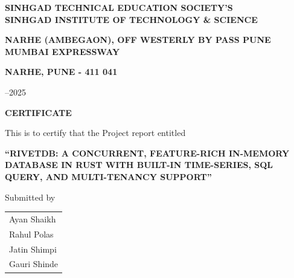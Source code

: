 \documentclass[12pt,a4paper]{report}
\begin{document}
\begin{titlepage}
\begin{center}
{\fontsize{14}{16}\selectfont \textbf{SINHGAD TECHNICAL EDUCATION SOCIETY'S\\
SINHGAD INSTITUTE OF TECHNOLOGY \& SCIENCE}}

\vspace{0.5\baselineskip}

{\fontsize{12}{14}\selectfont \textbf{NARHE (AMBEGAON), OFF WESTERLY BY PASS PUNE MUMBAI EXPRESSWAY}}

\vspace{0.5\baselineskip}

{\fontsize{14}{16}\selectfont \textbf{NARHE, PUNE - 411 041}}

\vspace{1.5\baselineskip}

{\fontsize{14}{16}--2025}

\end{center}
\end{titlepage}

\newpage
\thispagestyle{plain}
\begin{center}

\vspace*{2\baselineskip}

{\fontsize{16}{18}\selectfont \textbf{CERTIFICATE}}

\vspace{1.5\baselineskip}

\end{center}

\fontsize{12}{14}\selectfont
This is to certify that the Project report entitled

\vspace{0.5\baselineskip}

\begin{center}
{\fontsize{12}{14}\selectfont \textbf{``RIVETDB: A CONCURRENT, FEATURE-RICH IN-MEMORY DATABASE IN RUST WITH BUILT-IN TIME-SERIES, SQL QUERY, AND MULTI-TENANCY SUPPORT''}}
\end{center}

\vspace{1\baselineskip}

Submitted by

\vspace{0.5\baselineskip}

\begin{center}
\begin{tabular}{l}
Ayan Shaikh \\
Rahul Polas \\
Jatin Shimpi \\
Gauri Shinde \\
\end{tabular}
\end{center}
\end{document}

